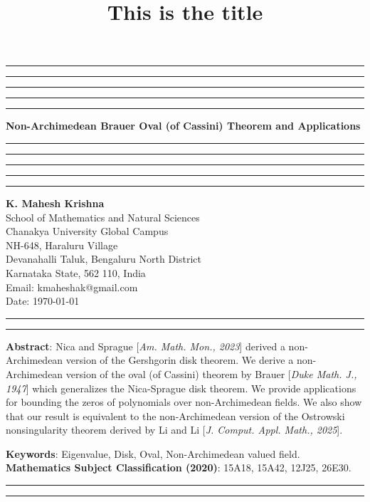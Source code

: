 \documentclass{amsart}
\title{This is the title}
\begin{document}
\hrule\hrule\hrule\hrule\hrule
\vspace{0.3cm}	
\begin{center}
{\bf\large{{Non-Archimedean Brauer Oval (of Cassini) Theorem and Applications}}}\\
\vspace{0.3cm}
\hrule\hrule\hrule\hrule\hrule
\vspace{0.3cm}
\textbf{K. Mahesh Krishna}\\
School of Mathematics and Natural Sciences\\
Chanakya University Global Campus\\
NH-648, Haraluru Village\\
Devanahalli Taluk, 	Bengaluru  North District\\
Karnataka State, 562 110, India\\
Email: kmaheshak@gmail.com\\

Date: \today
\end{center}

\hrule\hrule
\vspace{0.5cm}
\textbf{Abstract}: Nica and Sprague [\textit{Am. Math. Mon., 2023}]
 derived a non-Archimedean version of the Gershgorin disk theorem.  We derive a non-Archimedean version of  the oval (of Cassini)  theorem by  Brauer [\textit{Duke Math. J., 1947}] which generalizes the Nica-Sprague disk theorem. We provide applications for bounding the zeros of polynomials over non-Archimedean fields. We also show that our result is equivalent to the non-Archimedean version of the Ostrowski nonsingularity theorem derived by Li and Li [\textit{J. Comput. Appl. Math., 2025}]. 

\textbf{Keywords}:  Eigenvalue, Disk, Oval, Non-Archimedean valued field.\\
\textbf{Mathematics Subject Classification (2020)}:  15A18, 15A42, 12J25, 26E30.\\

\hrule


\hrule
\end{document}
